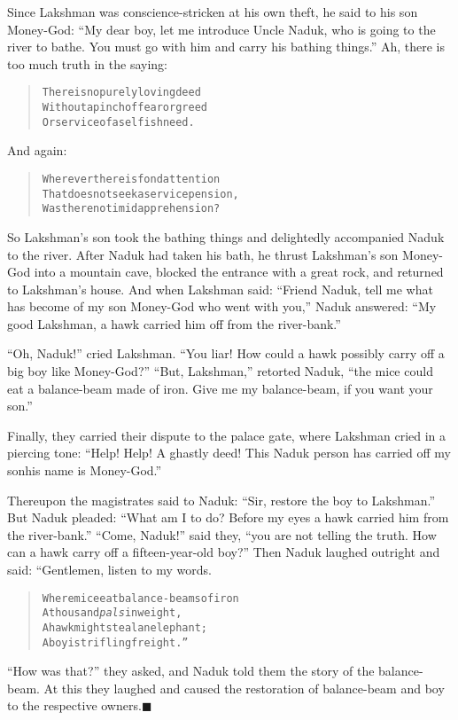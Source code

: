 \documentclass[article, twoside, 14pt]{memoir}
\newcommand{\qed}{\hfill \ensuremath{\blacksquare}}
\renewenvironment{verbatim}{%
\begin{quote}%
\vskip -10pt%
\begin{alltt}\normalfont\large}{\end{alltt}%
\end{quote}%
\vskip -10pt
} %
\begin{document}
Since Lakshman was conscience-stricken at his own theft, he said to
his son Money-God:
``My dear boy, let me introduce Uncle Naduk, who is going to the river to bathe. You must go with him and carry his bathing things.''
Ah, there is too much truth in the saying:

\begin{verbatim}
There is no purely loving deed
Without a pinch of fear or greed
Or service of a selfish need.
\end{verbatim}
And again:

\begin{verbatim}
Wherever there is fond attention
That does not seek a service pension,
Was there no timid apprehension?
\end{verbatim}
So Lakshman's son took the bathing things and delightedly
accompanied Naduk to the river. After Naduk had taken his bath, he
thrust Lakshman's son Money-God into a mountain cave, blocked the
entrance with a great rock, and returned to Lakshman's house. And
when Lakshman said:
``Friend Naduk, tell me what has become of my son Money-God who went with you,''
Naduk answered:
``My good Lakshman, a hawk carried him off from the river-bank.''

``Oh, Naduk!'' cried Lakshman.
``You liar! How could a hawk possibly carry off a big boy like Money-God?''
``But, Lakshman,'' retorted Naduk,
``the mice could eat a balance-beam made of iron. Give me my balance-beam, if you want your son.''

Finally, they carried their dispute to the palace gate, where
Lakshman cried in a piercing tone:
``Help! Help! A ghastly deed! This Naduk person has carried off my son{\textemdash}his name is Money-God.''

Thereupon the magistrates said to Naduk:
``Sir, restore the boy to Lakshman.'' But Naduk pleaded:
``What am I to do? Before my eyes a hawk carried him from the river-bank.''
``Come, Naduk!'' said they,
``you are not telling the truth. How can a hawk carry off a fifteen-year-old boy?''
Then Naduk laughed outright and said: “Gentlemen, listen to my
words.

\begin{verbatim}
Where mice eat balance-beams of iron
    A thousand \emph{pals} in weight,
A hawk might steal an elephant;
    A boy is trifling freight.”
\end{verbatim}
``How was that?'' they asked, and Naduk told them the story of the
balance-beam. At this they laughed and caused the restoration of
balance-beam and boy to the respective owners.\hyperref[s31]{\qed}
\end{document}
